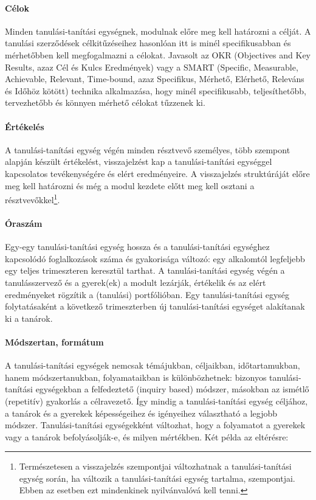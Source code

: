 \paragraph{Célok} Minden tanulási-tanítási egységnek, modulnak előre meg kell határozni a célját. A tanulási szerződések célkitűzéseihez hasonlóan itt is minél specifikusabban és mérhetőbben kell meg\-fo\-gal\-mazni a célokat. Javasolt az OKR  (Objectives and Key Results, azaz	Cél és Kulcs Eredmények) \citep{okr} vagy a SMART (Specific, Measurable, Achievable, Relevant, Time-bound, azaz Specifikus,  Mérhető, Elérhető, Releváns és Időhöz kötött) \citep{wiki:smart} technika alkalmazása, hogy minél specifikusabb, teljesíthetőbb, tervezhetőbb és könnyen mérhető célokat tűzzenek ki.

\paragraph{Értékelés} A tanulási-tanítási egység végén minden résztvevő személyes, több szem\-pont alap\-ján készült értékelést, visszajelzést kap a tanulási-tanítási egységgel kapcsolatos tevékenységére és elért eredményeire. A visszajelzés struktúráját előre meg kell határozni és még a modul kezdete előtt meg kell osztani a résztvevőkkel\footnote{Természetesen a visszajelzés szempontjai változhatnak a tanulási-tanítási egység során, ha változik a tanulási-tanítási egység tartalma, szempontjai. Ebben az esetben ezt mindenkinek nyilvánvalóvá kell tenni.}.

\paragraph{Óraszám} Egy-egy tanulási-tanítási egység hossza és a tanulási-tanítási egységhez kapcsolódó foglalkozások száma és gyakorisága változó: egy alkalomtól legfeljebb egy teljes trimeszteren keresztül tarthat. A tanulási-tanítási egység végén a tanulásszervező és a gyerek(ek) a modult lezárják, értékelik és az elért eredményeket rögzítik a (tanulási) portfólióban. Egy tanulási-tanítási egység folytatásaként a következő trimeszterben új tanulási-tanítási egységet alakítanak ki a tanárok.

\paragraph{Módszertan, formátum} A tanulási-tanítási egységek nemcsak témájukban,
céljaikban, időtartamukban, hanem módszertanukban, folyamataikban is különbözhetnek: bizonyos tanulási-tanítási egységekban a felfedeztető (inquiry based) módszer, másokban az ismétlő (repetitív) gyakorlás a célravezető. Így mindig a tanulási-tanítási egység céljához, a tanárok és a gyerekek képességeihez és igényeihez választható a legjobb módszer. Tanulási-tanítási egységekként változhat, hogy a folyamatot a gyerekek vagy a tanárok befolyásolják-e, és milyen mértékben. Két példa az eltérésre:

